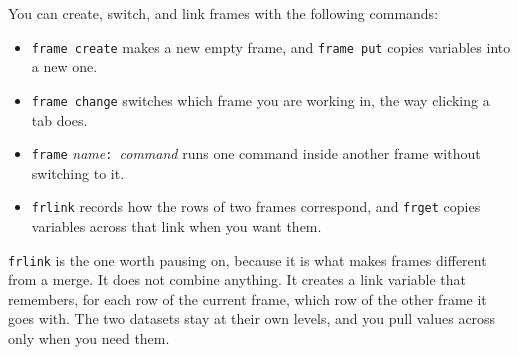 You can create, switch, and link frames with the following commands:
\begin{itemize}
    \item \texttt{frame create} makes a new empty frame, and \texttt{frame put} copies variables into a new one.
    \item \texttt{frame change} switches which frame you are working in, the way clicking a tab does.
    \item \texttt{frame} \emph{name}\texttt{: }\emph{command} runs one command inside another frame without switching to it.
    \item \texttt{frlink} records how the rows of two frames correspond, and \texttt{frget} copies variables across that link when you want them.
\end{itemize}
\texttt{frlink} is the one worth pausing on, because it is what makes frames different from a merge. It does not combine anything. It creates a link variable that remembers, for each row of the current frame, which row of the other frame it goes with. The two datasets stay at their own levels, and you pull values across only when you need them.

